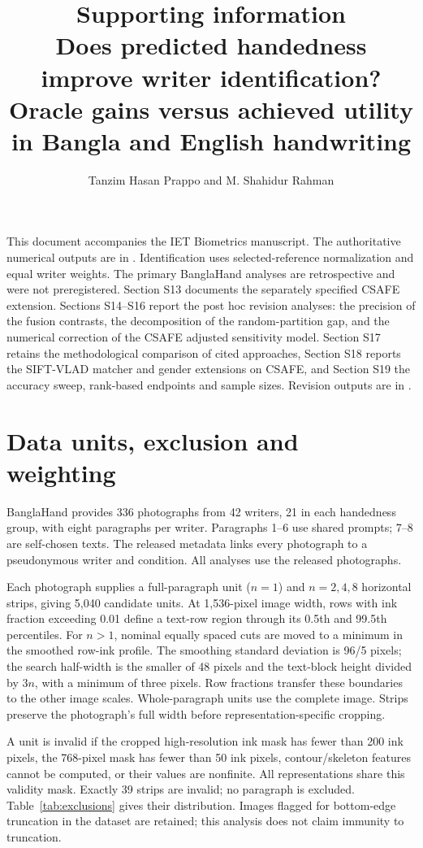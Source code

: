 \documentclass[10pt,a4paper]{article}
\title{Supporting information\\[4pt]\large Does predicted handedness improve writer identification? Oracle gains versus achieved utility in Bangla and English handwriting}
\author{Tanzim Hasan Prappo and M. Shahidur Rahman}
\date{}
\begin{document}
\maketitle
\vspace{-12pt}
This document accompanies the IET Biometrics manuscript. The authoritative numerical outputs are in . Identification uses selected-reference normalization and equal writer weights. The primary BanglaHand analyses are retrospective and were not preregistered. Section S13 documents the separately specified CSAFE extension. Sections S14--S16 report the post hoc revision analyses: the precision of the fusion contrasts, the decomposition of the random-partition gap, and the numerical correction of the CSAFE adjusted sensitivity model. Section S17 retains the methodological comparison of cited approaches, Section S18 reports the SIFT-VLAD matcher and gender extensions on CSAFE, and Section S19 the accuracy sweep, rank-based endpoints and sample sizes. Revision outputs are in .

\section{Data units, exclusion and weighting}
BanglaHand provides 336 photographs from 42 writers, 21 in each handedness group, with eight paragraphs per writer. Paragraphs 1--6 use shared prompts; 7--8 are self-chosen texts. The released metadata links every photograph to a pseudonymous writer and condition. All analyses use the released photographs.

Each photograph supplies a full-paragraph unit ($n=1$) and $n=2,4,8$ horizontal strips, giving 5,040 candidate units. At 1,536-pixel image width, rows with ink fraction exceeding 0.01 define a text-row region through its 0.5th and 99.5th percentiles. For $n>1$, nominal equally spaced cuts are moved to a minimum in the smoothed row-ink profile. The smoothing standard deviation is 96/5 pixels; the search half-width is the smaller of 48 pixels and the text-block height divided by $3n$, with a minimum of three pixels. Row fractions transfer these boundaries to the other image scales. Whole-paragraph units use the complete image. Strips preserve the photograph's full width before representation-specific cropping.

A unit is invalid if the cropped high-resolution ink mask has fewer than 200 ink pixels, the 768-pixel mask has fewer than 50 ink pixels, contour/skeleton features cannot be computed, or their values are nonfinite. All representations share this validity mask. Exactly 39 strips are invalid; no paragraph is excluded. Table~\ref{tab:exclusions} gives their distribution. Images flagged for bottom-edge truncation in the dataset are retained; this analysis does not claim immunity to truncation.
\end{document}
